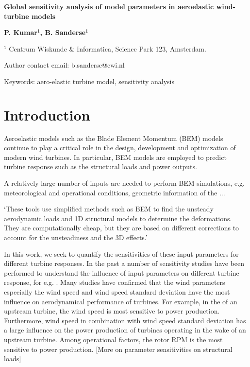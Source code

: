 \documentclass[11pt]{article}
\begin{document}
\raggedright  %

\vspace*{80pt}
{\LARGE \textbf{Global sensitivity analysis of model parameters in aeroelastic wind-turbine models}}
\vspace*{28pt}

\begin{addmargin}[2.5cm]{0em}%
\textbf{P. Kumar$^{\boldsymbol{\mathsf{1}}}$, B. Sanderse$^{\boldsymbol{\mathsf{1}}}$}

$^{\mathsf{1}}$ Centrum Wiskunde \& Informatica, Science Park 123, Amsterdam.


Author contact email: b.sanderse@cwi.nl

Keywords: aero-elastic turbine model, sensitivity analysis
\end{addmargin}

\section{Introduction}
Aeroelastic models such as the Blade Element Momentum (BEM) models \cite{HandBook} continue to play a critical role in the design, development and optimization of modern wind turbines. In particular, BEM models are employed to predict turbine response such as the structural loads and power outputs.

A relatively large number of inputs are needed to perform BEM simulations, e.g. meteorological and operational conditions, geometric information of the ...

`These tools use simplified methods such as BEM to find the unsteady aerodynamic loads and 1D structural models to determine the deformations. They are computationally cheap, but they are based on different corrections to account for the unsteadiness and the 3D effects.' \cite{Sayed2019}

In this work, we seek to quantify the sensitivities of these input parameters for different turbine responses. In the past a number of sensitivity studies have been performed to understand the influence of input parameters on different turbine response, for e.g. \cite{moriarty2002effect, eggers2003wind, McKay2014, dykes2014sensitivity, Robertson2018}. Many studies have confirmed that the wind parameters especially the wind speed and wind speed standard deviation have the most influence on aerodynamical performance of turbines. For example, in the of an upstream turbine, the wind speed is most sensitive to power production. Furthermore, wind speed in combination with wind speed standard deviation has a large influence on the power production of turbines operating in the wake of an upstream turbine. Among operational factors, the rotor RPM is the most sensitive to power production. [More on parameter sensitivities on structural loads]
\end{document}
